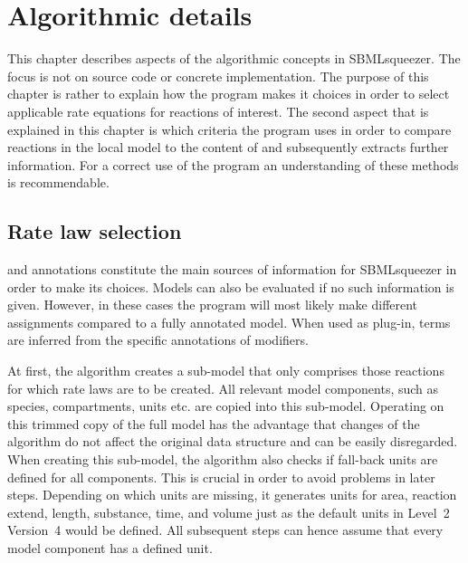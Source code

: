 \chapter{Algorithmic details}

This chapter describes aspects of the algorithmic concepts in SBMLsqueezer.
The focus is not on source code or concrete implementation.
The purpose of this chapter is rather to explain how the program makes it choices in order to select applicable rate equations for reactions of interest.
The second aspect that is explained in this chapter is which criteria the program uses in order to compare reactions in the local model to the content of \SABIO and subsequently extracts further information.
For a correct use of the program an understanding of these methods is recommendable.

\section{Rate law selection}

\MIRIAM \citep{Le2005, Laible2007, Juty2012, Juty2013} and \SBO annotations \citep{Courtot2011} constitute the main sources of information for SBMLsqueezer in order to make its choices.
Models can also be evaluated if no such information is given.
However, in these cases the program will most likely make different assignments compared to a fully annotated model.
When used as \CellDesigner plug-in, \SBO terms are inferred from the specific annotations of modifiers.

At first, the algorithm creates a sub-model that only comprises those reactions for which rate laws are to be created.
All relevant model components, such as species, compartments, units etc. are copied into this sub-model.
Operating on this trimmed copy of the full model has the advantage that changes of the algorithm do not affect the original data structure and can be easily disregarded.
When creating this sub-model, the algorithm also checks if fall-back units are defined for all components.
This is crucial in order to avoid problems in later steps.
Depending on which units are missing, it generates units for area, reaction extend, length, substance, time, and volume just as the default units in \SBML Level~2 Version~4 would be defined.
All subsequent steps can hence assume that every model component has a defined unit. 

